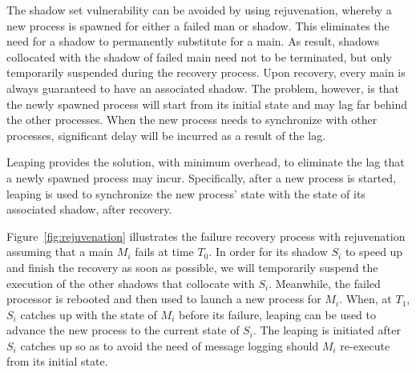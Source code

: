 
The shadow set vulnerability can be avoided by using rejuvenation, whereby a new process is spawned for either a failed man or shadow. This eliminates  the need for a shadow to permanently substitute for a main. As result, shadows collocated with the shadow of failed main need not to be terminated, but only temporarily suspended during the recovery process.  Upon recovery, every main is always guaranteed to have an associated shadow. The problem, however, is that the newly spawned process will start from its initial state and may lag far behind the other processes. When the new process needs to synchronize with other processes, significant delay will be incurred as a result of the lag. 

Leaping provides the solution, with minimum overhead, to eliminate the lag that a newly spawned process may incur. Specifically, after a new process is started, leaping is used to synchronize the new process' state with the state of its associated shadow, after recovery. 

Figure~\ref{fig:rejuvenation} illustrates the failure recovery process with rejuvenation assuming that a main $M_i$ fails at time $T_0$.
In order for its shadow $S_i$ to speed up and finish the recovery as soon as possible, 
we will temporarily suspend the execution of the other shadows that collocate with $S_i$. %
Meanwhile, the failed processor is rebooted and then used to launch a new process for $M_i$. When, at $T_1$, $S_i$ catches up with the state of $M_i$ before its failure, leaping can be used to advance the new process to the current state of $S_i$. The leaping is initiated after $S_i$ catches up so as to avoid the need of message logging should $M_i$ re-execute from its initial state. 

